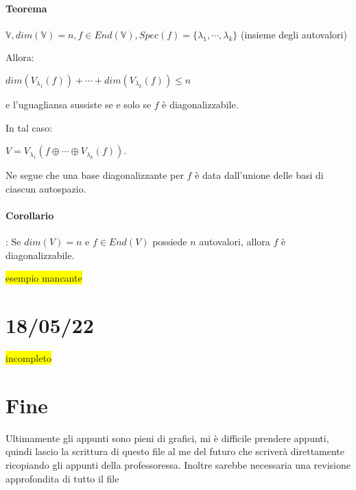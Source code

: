 \documentclass{article}
\newcommand{\hl}[1]{\colorbox{yellow}{#1}}
\newcommand{\V}{\mathbb{V}}
\begin{document}
\paragraph*{Teorema} $\V, dim(\V)=n,f\in End(\V),Spec(f)=\{\lambda_1,\cdots,\lambda_k\}$ (insieme degli autovalori)

Allora:

$dim(V_{\lambda_1}(f))+\cdots+dim(V_{\lambda_k}(f))\le n$

e l'uguagliansa sussiste se e solo se $f$ è diagonalizzabile.

In tal caso:

$V=V_{\lambda_1}(f\oplus\cdots\oplus V_{\lambda_k}(f))$.

Ne segue che una base diagonalizzante per $f$ è data dall'unione delle basi di ciascun autospazio.

\paragraph*{Corollario}: Se $dim(V)=n$ e $f\in End(V)$ possiede $n$ autovalori, allora $f$ è diagonalizzabile.

\hl{esempio mancante}
\section{18/05/22}
\hl{incompleto}
\section*{Fine}
Ultimamente gli appunti sono pieni di grafici, mi è difficile prendere appunti, quindi lascio la scrittura di questo file al me del futuro che scriverà direttamente ricopiando gli appunti della professoressa.
Inoltre sarebbe necessaria una revisione approfondita di tutto il file
\end{document}
